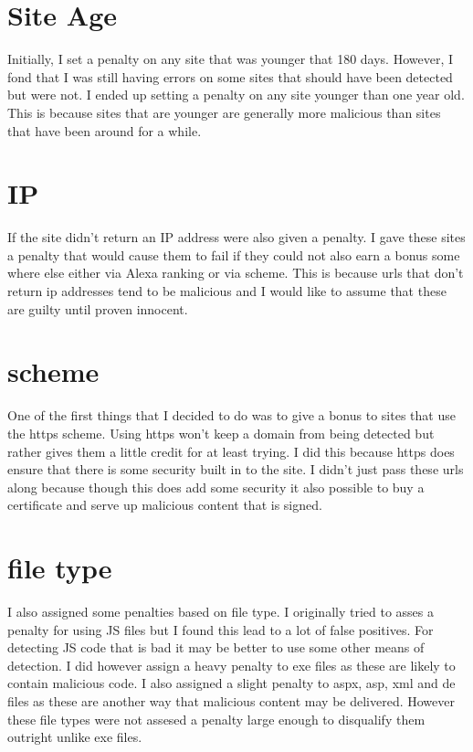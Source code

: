 \documentclass[letterpaper, onecolumn,10pt]{IEEEtran}
\begin{document}
		\section{Site Age}
		Initially, I set a penalty on any site that was younger that 180 days. However, I fond that I was still having errors on some sites that should have been detected but were not. I ended up setting a penalty on any site younger than one year old. This is because sites that are younger are generally more malicious than sites that have been around for a while.\\
		
		\section{IP}
		If the site didn't return an IP address were also given a penalty. I gave these sites a penalty that would cause them to fail if they could not also earn a bonus some where else either via Alexa ranking or via scheme. This is because urls that don't return ip addresses tend to be malicious and I would like to assume that these are guilty until proven innocent.\\
		
		\section{scheme}
		One of the first things that I decided to do was to give a bonus to sites that use the https scheme. Using https won't keep a domain from being detected but rather gives them a little credit for at least trying. I did this because https does ensure that there is some security built in to the site. I didn't just pass these urls along because though this does add some security it also possible to buy a certificate and serve up malicious content that is signed.\\
		
		\section{file type}
		I also assigned some penalties based on file type. I originally tried to asses a penalty for using JS files but I found this lead to a lot of false positives. For detecting JS code that is bad it may be better to use some other means of detection. I did however assign a heavy penalty to exe files as these are likely to contain malicious code. I also assigned  a slight penalty to aspx, asp, xml and de files as these are another way that malicious content may be delivered. However these file types were not assesed a penalty large enough to disqualify them outright unlike exe files.\\
		
\end{document}
